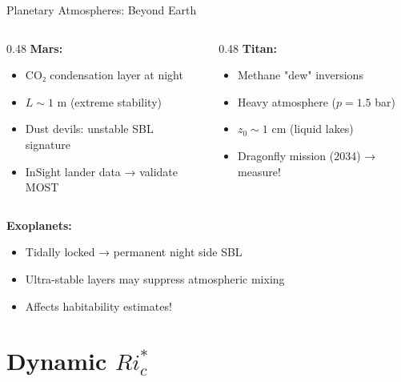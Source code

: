 \documentclass[10pt,aspectratio=169]{beamer}
\begin{document}
\begin{frame}{Planetary Atmospheres: Beyond Earth}
  \begin{columns}[T]
    \begin{column}{0.48\textwidth}
      \textbf{Mars:}
      \begin{itemize}
        \item CO₂ condensation layer at night
        \item $L \sim 1$ m (extreme stability)
        \item Dust devils: unstable SBL signature
        \item InSight lander data → validate MOST
      \end{itemize}
    \end{column}
    \begin{column}{0.48\textwidth}
      \textbf{Titan:}
      \begin{itemize}
        \item Methane "dew" inversions
        \item Heavy atmosphere ($p = 1.5$ bar)
        \item $z_0 \sim 1$ cm (liquid lakes)
        \item Dragonfly mission (2034) → measure!
      \end{itemize}
    \end{column}
  \end{columns}
  
  \vspace{0.5cm}
  \textbf{Exoplanets:}
  \begin{itemize}
    \item Tidally locked → permanent night side SBL
    \item Ultra-stable layers may suppress atmospheric mixing
    \item Affects habitability estimates!
  \end{itemize}
\end{frame}

\section{Dynamic $Ri_c^*$}
\end{document}
